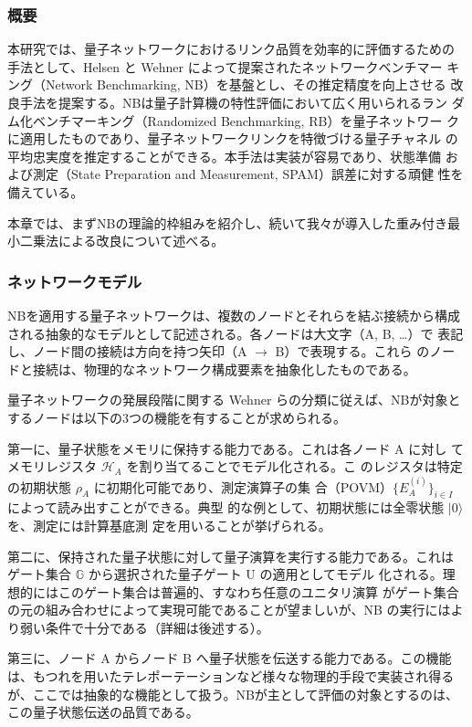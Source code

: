 \documentclass[conference]{IEEEtran}
\begin{document}
\subsubsection*{概要}
\label{sec:orga1fddfe}
本研究では、量子ネットワークにおけるリンク品質を効率的に評価するための
手法として、Helsen と Wehner によって提案されたネットワークベンチマー
キング（Network Benchmarking, NB）を基盤とし、その推定精度を向上させる
改良手法を提案する。NBは量子計算機の特性評価において広く用いられるラン
ダム化ベンチマーキング（Randomized Benchmarking, RB）を量子ネットワー
クに適用したものであり、量子ネットワークリンクを特徴づける量子チャネル
の平均忠実度を推定することができる。本手法は実装が容易であり、状態準備
および測定（State Preparation and Measurement, SPAM）誤差に対する頑健
性を備えている。

本章では、まずNBの理論的枠組みを紹介し、続いて我々が導入した重み付き最
小二乗法による改良について述べる。


\subsubsection*{ネットワークモデル}
\label{sec:org4f0eb63}
NBを適用する量子ネットワークは、複数のノードとそれらを結ぶ接続から構成
される抽象的なモデルとして記述される。各ノードは大文字（A, B, \ldots{}）で
表記し、ノード間の接続は方向を持つ矢印（A \(\to\) B）で表現する。これら
のノードと接続は、物理的なネットワーク構成要素を抽象化したものである。

量子ネットワークの発展段階に関する Wehner らの分類に従えば、NBが対象と
するノードは以下の3つの機能を有することが求められる。

第一に、量子状態をメモリに保持する能力である。これは各ノード A に対し
てメモリレジスタ \(\mathcal{H}_A\) を割り当てることでモデル化される。こ
のレジスタは特定の初期状態 \(\rho_A\) に初期化可能であり、測定演算子の集
合（POVM）\(\{E_A^{(i)}\}_{i \in I}\) によって読み出すことができる。典型
的な例として、初期状態には全零状態 \(|0\rangle\) を、測定には計算基底測
定を用いることが挙げられる。

第二に、保持された量子状態に対して量子演算を実行する能力である。これは
ゲート集合 \(\mathbb{G}\) から選択された量子ゲート U の適用としてモデル
化される。理想的にはこのゲート集合は普遍的、すなわち任意のユニタリ演算
がゲート集合の元の組み合わせによって実現可能であることが望ましいが、NB
の実行にはより弱い条件で十分である（詳細は後述する）。

第三に、ノード A からノード B へ量子状態を伝送する能力である。この機能
は、もつれを用いたテレポーテーションなど様々な物理的手段で実装され得る
が、ここでは抽象的な機能として扱う。NBが主として評価の対象とするのは、
この量子状態伝送の品質である。
\end{document}
